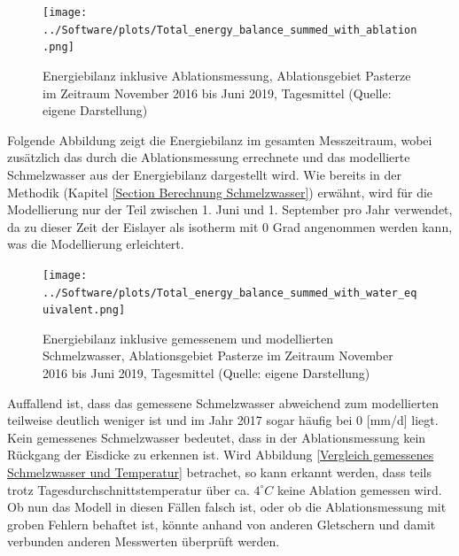 \documentclass[11pt,a4paper]{article}
\begin{document}
\begin{figure}[H]
\centering
\texttt{[image: ../Software/plots/Total\_energy\_balance\_summed\_with\_ablation.png]}
\caption[Energiebilanz inklusive Ablationsmessung, Ablationsgebiet Pasterze im Zeitraum November 2016 bis Juni 2019, Tagesmittel]{Energiebilanz inklusive Ablationsmessung, Ablationsgebiet Pasterze im Zeitraum November 2016 bis Juni 2019, Tagesmittel (Quelle: eigene Darstellung)}
\label{fig:Energiebilanz im gesamten Messzeitraum inklusive Ablationsmessung}
\end{figure}


Folgende Abbildung zeigt die Energiebilanz im gesamten Messzeitraum, wobei zusätzlich das durch die Ablationsmessung errechnete und das modellierte Schmelzwasser aus der Energiebilanz dargestellt wird. Wie bereits in der Methodik (Kapitel \ref{Section Berechnung Schmelzwasser}) erwähnt, wird für die Modellierung nur der Teil zwischen 1. Juni und 1. September pro Jahr verwendet, da zu dieser Zeit der Eislayer als isotherm mit 0 Grad angenommen werden kann, was die Modellierung erleichtert.  






\begin{figure}[H]
\centering
\texttt{[image: ../Software/plots/Total\_energy\_balance\_summed\_with\_water\_equivalent.png]}
\caption[Energiebilanz inklusive gemessenem und modellierten Schmelzwasser, Ablationsgebiet Pasterze im Zeitraum November 2016 bis Juni 2019, Tagesmittel]{Energiebilanz inklusive gemessenem und modellierten Schmelzwasser, Ablationsgebiet Pasterze im Zeitraum November 2016 bis Juni 2019, Tagesmittel (Quelle: eigene Darstellung)}
\label{fig:Energiebilanz im gesamten Messzeitraum inklusive gemessenem und modellierten Schmelzwasser}
\end{figure}

Auffallend ist, dass das gemessene Schmelzwasser abweichend zum modellierten teilweise deutlich weniger ist und im Jahr 2017 sogar häufig bei 0 [mm/d] liegt. Kein gemessenes Schmelzwasser bedeutet, dass in der Ablationsmessung kein Rückgang der Eisdicke zu erkennen ist. Wird Abbildung \ref{Vergleich gemessenes Schmelzwasser und Temperatur} betrachet, so kann erkannt werden, dass teils trotz Tagesdurchschnittstemperatur über ca. $4^\circ C$ keine Ablation gemessen wird. Ob nun das Modell in diesen Fällen falsch ist, oder ob die Ablationsmessung mit groben Fehlern behaftet ist, könnte anhand von anderen Gletschern und damit verbunden anderen Messwerten überprüft werden.
\end{document}
